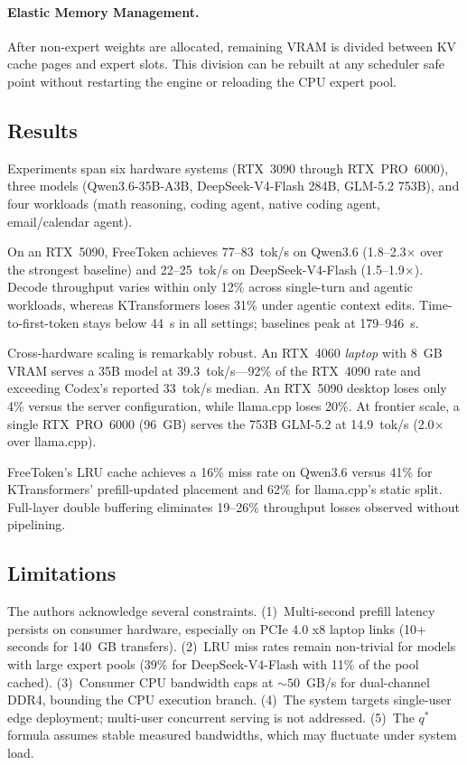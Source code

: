 \documentclass[11pt,a4paper]{article}
\begin{document}
\paragraph{Elastic Memory Management.} After non-expert weights are allocated, remaining VRAM is divided between KV cache pages and expert slots. This division can be rebuilt at any scheduler safe point without restarting the engine or reloading the CPU expert pool.

\subsection{Results}
Experiments span six hardware systems (RTX~3090 through RTX~PRO~6000), three models (Qwen3.6-35B-A3B, DeepSeek-V4-Flash 284B, GLM-5.2 753B), and four workloads (math reasoning, coding agent, native coding agent, email/calendar agent).

On an RTX~5090, FreeToken achieves 77--83~tok/s on Qwen3.6 (1.8--2.3$\times$ over the strongest baseline) and 22--25~tok/s on DeepSeek-V4-Flash (1.5--1.9$\times$). Decode throughput varies within only 12\% across single-turn and agentic workloads, whereas KTransformers loses 31\% under agentic context edits. Time-to-first-token stays below 44~s in all settings; baselines peak at 179--946~s.

Cross-hardware scaling is remarkably robust. An RTX~4060 \emph{laptop} with 8~GB VRAM serves a 35B model at 39.3~tok/s---92\% of the RTX~4090 rate and exceeding Codex's reported 33~tok/s median. An RTX~5090 desktop loses only 4\% versus the server configuration, while llama.cpp loses 20\%. At frontier scale, a single RTX~PRO~6000 (96~GB) serves the 753B GLM-5.2 at 14.9~tok/s (2.0$\times$ over llama.cpp).

FreeToken's LRU cache achieves a 16\% miss rate on Qwen3.6 versus 41\% for KTransformers' prefill-updated placement and 62\% for llama.cpp's static split. Full-layer double buffering eliminates 19--26\% throughput losses observed without pipelining.

\subsection{Limitations}
The authors acknowledge several constraints. (1)~Multi-second prefill latency persists on consumer hardware, especially on PCIe 4.0 x8 laptop links (10+ seconds for 140~GB transfers). (2)~LRU miss rates remain non-trivial for models with large expert pools (39\% for DeepSeek-V4-Flash with 11\% of the pool cached). (3)~Consumer CPU bandwidth caps at ${\sim}50$~GB/s for dual-channel DDR4, bounding the CPU execution branch. (4)~The system targets single-user edge deployment; multi-user concurrent serving is not addressed. (5)~The $q^*$ formula assumes stable measured bandwidths, which may fluctuate under system load.
\end{document}
